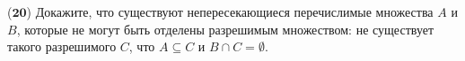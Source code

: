 ($\mathbf{20}$)
Докажите, что существуют непересекающиеся перечислимые множества $A$ и $B$, которые не могут быть отделены разрешимым
множеством: не существует такого разрешимого $C$, что $A \subseteq C$ и $B \cap C = \emptyset$.